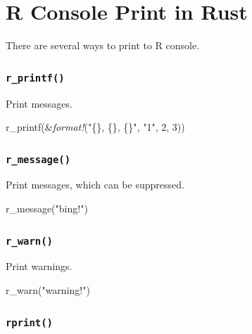 \documentclass[]{book}
\newenvironment{Shaded}{\begin{snugshade}}{\end{snugshade}}
\newcommand{\DecValTok}[1]{\textcolor[rgb]{0.00,0.00,0.81}{{#1}}}
\newcommand{\StringTok}[1]{\textcolor[rgb]{0.31,0.60,0.02}{{#1}}}
\newcommand{\PreprocessorTok}[1]{\textcolor[rgb]{0.56,0.35,0.01}{\textit{{#1}}}}
\newcommand{\NormalTok}[1]{{#1}}
\begin{document}
\chapter{R Console Print in Rust}\label{r-console-print-in-rust}

There are several ways to print to R console.

\subsection{\texorpdfstring{\texttt{r\_printf()}}{r\_printf()}}\label{rux5fprintf}

Print messages.

\begin{Shaded}
\begin{Highlighting}[]
\NormalTok{r_printf(&}\PreprocessorTok{format!}\NormalTok{(}\StringTok{"\{\}, \{\}, \{\}"}\NormalTok{, }\StringTok{"1"}\NormalTok{, }\DecValTok{2}\NormalTok{, }\DecValTok{3}\NormalTok{))}
\end{Highlighting}
\end{Shaded}

\subsection{\texorpdfstring{\texttt{r\_message()}}{r\_message()}}\label{rux5fmessage}

Print messages, which can be suppressed.

\begin{Shaded}
\begin{Highlighting}[]
\NormalTok{r_message(}\StringTok{"bing!"}\NormalTok{)}
\end{Highlighting}
\end{Shaded}

\subsection{\texorpdfstring{\texttt{r\_warn()}}{r\_warn()}}\label{rux5fwarn}

Print warnings.

\begin{Shaded}
\begin{Highlighting}[]
\NormalTok{r_warn(}\StringTok{"warning!"}\NormalTok{)}
\end{Highlighting}
\end{Shaded}

\subsection{\texorpdfstring{\texttt{rprint()}}{rprint()}}\label{rprint}
\end{document}
